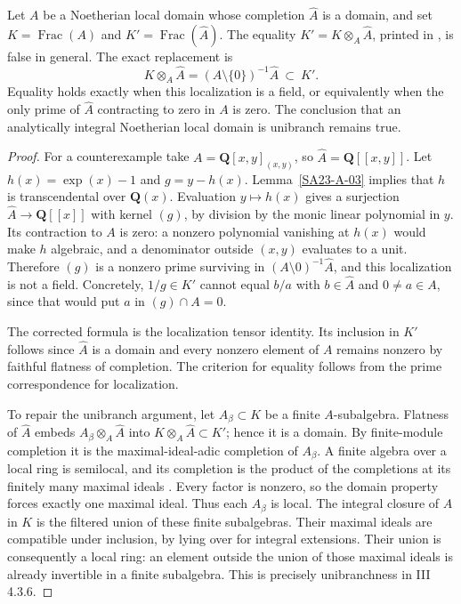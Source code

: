 \begin{proposition}\label{SA23-D-11}
Let $A$ be a Noetherian local domain whose completion $\widehat A$
is a domain, and set $K=\operatorname{Frac}(A)$ and
$K'=\operatorname{Frac}(\widehat A)$.  The equality
$K'=K\otimes_A\widehat A$, printed in
\cite[III 4.3.6, p.~133, line 7]{algEGAIII1}, is false in general.
The exact replacement is
\[
 K\otimes_A\widehat A=(A\setminus\{0\})^{-1}\widehat A
 \ \subset\ K'.
\]
Equality holds exactly when this localization is a field, or
equivalently when the only prime of $\widehat A$ contracting to
zero in $A$ is zero.  The conclusion that an analytically integral
Noetherian local domain is unibranch remains true.
\end{proposition}
\begin{proof}
For a counterexample take $A=\mathbf Q[x,y]_{(x,y)}$, so
$\widehat A=\mathbf Q[[x,y]]$.  Let $h(x)=\exp(x)-1$ and
$g=y-h(x)$.  Lemma~\ref{SA23-A-03} implies that $h$ is
transcendental over $\mathbf Q(x)$.
Evaluation $y\mapsto h(x)$ gives a surjection
$\widehat A\to\mathbf Q[[x]]$ with kernel $(g)$, by division
by the monic linear polynomial in $y$.  Its contraction to $A$
is zero: a nonzero polynomial vanishing at $h(x)$ would make
$h$ algebraic, and a denominator outside $(x,y)$ evaluates to a
unit.  Therefore $(g)$ is a nonzero prime surviving in
$(A\setminus0)^{-1}\widehat A$, and this localization is not a
field.  Concretely, $1/g\in K'$ cannot equal $b/a$ with
$b\in\widehat A$ and $0\ne a\in A$, since that would put
$a$ in $(g)\cap A=0$.

The corrected formula is the localization tensor identity.  Its
inclusion in $K'$ follows since $\widehat A$ is a domain and
every nonzero element of $A$ remains nonzero by faithful flatness
of completion.  The criterion for equality follows from the
prime correspondence for localization.

To repair the unibranch argument, let $A_\beta\subset K$ be a
finite $A$-subalgebra.  Flatness of $\widehat A$ embeds
$A_\beta\otimes_A\widehat A$ into
$K\otimes_A\widehat A\subset K'$; hence it is a domain.
By finite-module completion it is the maximal-ideal-adic
completion of $A_\beta$.  A finite algebra over a local ring is
semilocal, and its completion is the product of the completions
at its finitely many maximal ideals
\cite[Lemmas 10.97.1 and 10.97.8]{algStacksNoetherianCompletion}.
Every factor is nonzero, so the domain property forces exactly
one maximal ideal.  Thus each $A_\beta$ is local.
The integral closure of $A$ in $K$ is the filtered union of
these finite subalgebras.  Their maximal ideals are compatible
under inclusion, by lying over for integral extensions.  Their
union is consequently a local ring: an element outside the union
of those maximal ideals is already invertible in a finite
subalgebra.  This is precisely unibranchness in III 4.3.6.
\end{proof}

